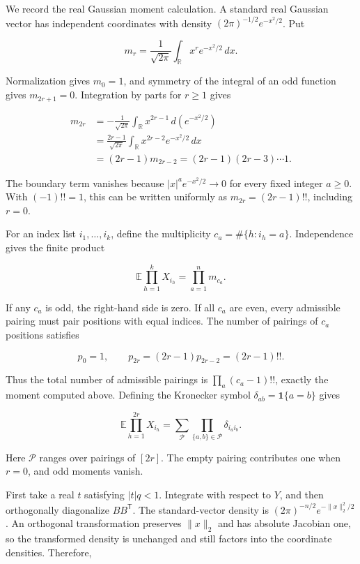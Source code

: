 \documentclass[11pt,a4paper]{article}
\begin{document}
We record the real Gaussian moment calculation. A standard real Gaussian vector has independent coordinates with density \((2\pi)^{-1/2}e^{-x^2/2}\). Put

\[
m_r=\frac1{\sqrt{2\pi}}\int_{\mathbb R}x^re^{-x^2/2}\,dx.
\]

Normalization gives \(m_0=1\), and symmetry of the integral of an odd function gives \(m_{2r+1}=0\). Integration by parts for \(r\ge1\) gives

\[
\begin{aligned}
m_{2r}
&=-\frac1{\sqrt{2\pi}}\int_{\mathbb R}x^{2r-1}\,d(e^{-x^2/2})\\
&=\frac{2r-1}{\sqrt{2\pi}}\int_{\mathbb R}x^{2r-2}e^{-x^2/2}\,dx\\
&=(2r-1)m_{2r-2}
=(2r-1)(2r-3)\cdots1.
\end{aligned}
\]

The boundary term vanishes because \(|x|^ae^{-x^2/2}\to0\) for every fixed integer \(a\ge0\). With \((-1)!!=1\), this can be written uniformly as \(m_{2r}=(2r-1)!!\), including \(r=0\).

For an index list \(i_1,\ldots,i_k\), define the multiplicity \(c_a=\#\{h:i_h=a\}\). Independence gives the finite product

\[
\mathbb E\prod_{h=1}^kX_{i_h}=\prod_{a=1}^n m_{c_a}.
\]

If any \(c_a\) is odd, the right-hand side is zero. If all \(c_a\) are even, every admissible pairing must pair positions with equal indices. The number of pairings of \(c_a\) positions satisfies

\[
p_0=1,\qquad p_{2r}=(2r-1)p_{2r-2}
=(2r-1)!!.
\]

Thus the total number of admissible pairings is \(\prod_a(c_a-1)!!\), exactly the moment computed above. Defining the Kronecker symbol \(\delta_{ab}=\mathbf1\{a=b\}\) gives

\[
\mathbb E\prod_{h=1}^{2r}X_{i_h}
=\sum_{\mathcal P}\prod_{\{a,b\}\in\mathcal P}\delta_{i_ai_b}.
\]

Here \(\mathcal P\) ranges over pairings of \([2r]\). The empty pairing contributes one when \(r=0\), and odd moments vanish.

First take a real \(t\) satisfying \(|t|q<1\). Integrate with respect to \(Y\), and then orthogonally diagonalize \(BB^{\mathsf T}\). The standard-vector density is \((2\pi)^{-n/2}e^{-\|x\|_2^2/2}\). An orthogonal transformation preserves \(\|x\|_2\) and has absolute Jacobian one, so the transformed density is unchanged and still factors into the coordinate densities. Therefore,
\end{document}
